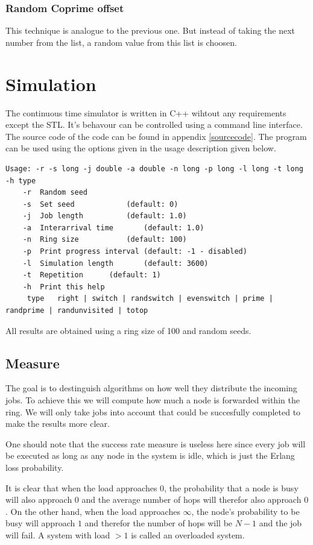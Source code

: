 \documentclass[10pt,a4paper,titlepage]{article}
\begin{document}
\subsubsection{Random Coprime offset}
This technique is analogue to the previous one. But instead of taking the next number from the list, a random value from this list is choosen.


\section{Simulation}
The continuous time simulator is written in C++ wihtout any requirements except the STL. It's behavour can be controlled using a command line interface. The source code of the code can be found in appendix \ref{sourcecode}. The program can be used using the options given in the usage description given below.

\begin{lstlisting}
Usage: -r -s long -j double -a double -n long -p long -l long -t long -h type
	-r	Random seed
	-s	Set seed			(default: 0)
	-j	Job length			(default: 1.0)
	-a	Interarrival time		(default: 1.0)
	-n	Ring size			(default: 100)
	-p	Print progress interval	(default: -1 - disabled)
	-l	Simulation length		(default: 3600)
	-t	Repetition		(default: 1)
	-h	Print this help
	 type	right | switch | randswitch | evenswitch | prime | randprime | randunvisited | totop
\end{lstlisting}

All results are obtained using a ring size of 100 and random seeds.


\subsection{Measure}

The goal is to destinguish algorithms on how well they distribute the incoming jobs. To achieve this we will compute how much a node is forwarded within the ring. We will only take jobs into account that could be succesfully completed to make the results more clear.

One should note that the success rate measure is useless here since every job will be executed as long as any node in the system is idle, which is just the Erlang loss probability. 

It is clear that when the load approaches $0$, the probability that a node is busy will also approach $0$ and the average number of hops will therefor also approach $0$. On the other hand, when the load approaches $\infty$, the node's probability to be busy will approach $1$ and therefor the number of hops will be $N-1$ and the job will fail. A system with load $> 1$ is called an overloaded system.
\end{document}
